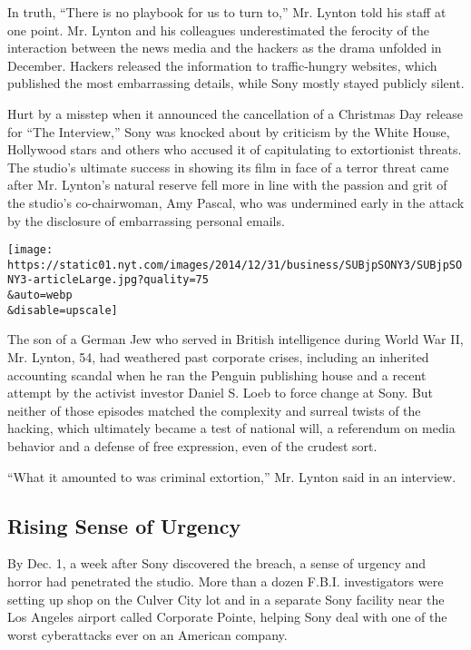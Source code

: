 In truth, ``There is no playbook for us to turn to,'' Mr. Lynton told
his staff at one point. Mr. Lynton and his colleagues underestimated the
ferocity of the interaction between the news media and the hackers as
the drama unfolded in December. Hackers released the information to
traffic-hungry websites, which published the most embarrassing details,
while Sony mostly stayed publicly silent.

Hurt by a misstep when it announced the cancellation of a Christmas Day
release for ``The Interview,'' Sony was knocked about by criticism by
the White House, Hollywood stars and others who accused it of
capitulating to extortionist threats. The studio's ultimate success in
showing its film in face of a terror threat came after Mr. Lynton's
natural reserve fell more in line with the passion and grit of the
studio's co-chairwoman, Amy Pascal, who was undermined early in the
attack by the disclosure of embarrassing personal emails.

\texttt{[image: https://static01.nyt.com/images/2014/12/31/business/SUBjpSONY3/SUBjpSONY3-articleLarge.jpg?quality=75\\\&auto=webp\\\&disable=upscale]}

The son of a German Jew who served in British intelligence during World
War II, Mr. Lynton, 54, had weathered past corporate crises, including
an inherited accounting scandal when he ran the Penguin publishing house
and a recent attempt by the activist investor Daniel S. Loeb to force
change at Sony. But neither of those episodes matched the complexity and
surreal twists of the hacking, which ultimately became a test of
national will, a referendum on media behavior and a defense of free
expression, even of the crudest sort.

``What it amounted to was criminal extortion,'' Mr. Lynton said in an
interview.

\hypertarget{rising-sense-of-urgency}{%
\subsection{Rising Sense of Urgency}\label{rising-sense-of-urgency}}

By Dec. 1, a week after Sony discovered the breach, a sense of urgency
and horror had penetrated the studio. More than a dozen F.B.I.
investigators were setting up shop on the Culver City lot and in a
separate Sony facility near the Los Angeles airport called Corporate
Pointe, helping Sony deal with one of the worst cyberattacks ever on an
American company.

